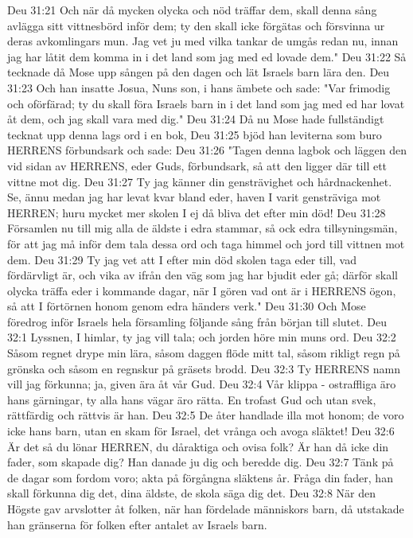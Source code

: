 Deu 31:21  Och när då mycken olycka och nöd träffar dem, skall denna sång avlägga sitt vittnesbörd inför dem; ty den skall icke förgätas och försvinna ur deras avkomlingars mun. Jag vet ju med vilka tankar de umgås redan nu, innan jag har låtit dem komma in i det land som jag med ed lovade dem."
Deu 31:22  Så tecknade då Mose upp sången på den dagen och lät Israels barn lära den.
Deu 31:23  Och han insatte Josua, Nuns son, i hans ämbete och sade: "Var frimodig och oförfärad; ty du skall föra Israels barn in i det land som jag med ed har lovat åt dem, och jag skall vara med dig."
Deu 31:24  Då nu Mose hade fullständigt tecknat upp denna lags ord i en bok,
Deu 31:25  bjöd han leviterna som buro HERRENS förbundsark och sade:
Deu 31:26  "Tagen denna lagbok och läggen den vid sidan av HERRENS, eder Guds, förbundsark, så att den ligger där till ett vittne mot dig.
Deu 31:27  Ty jag känner din gensträvighet och hårdnackenhet. Se, ännu medan jag har levat kvar bland eder, haven I varit gensträviga mot HERREN; huru mycket mer skolen I ej då bliva det efter min död!
Deu 31:28  Församlen nu till mig alla de äldste i edra stammar, så ock edra tillsyningsmän, för att jag må inför dem tala dessa ord och taga himmel och jord till vittnen mot dem.
Deu 31:29  Ty jag vet att I efter min död skolen taga eder till, vad fördärvligt är, och vika av ifrån den väg som jag har bjudit eder gå; därför skall olycka träffa eder i kommande dagar, när I gören vad ont är i HERRENS ögon, så att I förtörnen honom genom edra händers verk."
Deu 31:30  Och Mose föredrog inför Israels hela församling följande sång från början till slutet.
Deu 32:1  Lyssnen, I himlar, ty jag vill tala; och jorden höre min muns ord.
Deu 32:2  Såsom regnet drype min lära, såsom daggen flöde mitt tal, såsom rikligt regn på grönska och såsom en regnskur på gräsets brodd.
Deu 32:3  Ty HERRENS namn vill jag förkunna; ja, given ära åt vår Gud.
Deu 32:4  Vår klippa - ostraffliga äro hans gärningar, ty alla hans vägar äro rätta. En trofast Gud och utan svek, rättfärdig och rättvis är han.
Deu 32:5  De åter handlade illa mot honom; de voro icke hans barn, utan en skam för Israel, det vrånga och avoga släktet!
Deu 32:6  Är det så du lönar HERREN, du dåraktiga och ovisa folk? Är han då icke din fader, som skapade dig? Han danade ju dig och beredde dig.
Deu 32:7  Tänk på de dagar som fordom voro; akta på förgångna släktens år. Fråga din fader, han skall förkunna dig det, dina äldste, de skola säga dig det.
Deu 32:8  När den Högste gav arvslotter åt folken, när han fördelade människors barn, då utstakade han gränserna för folken efter antalet av Israels barn.
